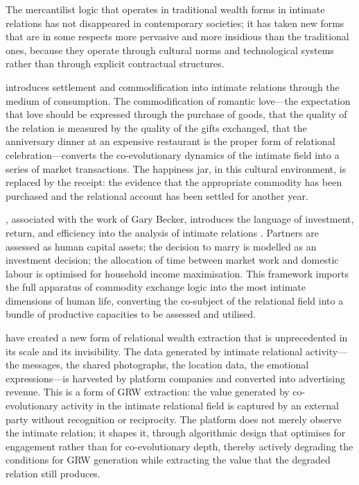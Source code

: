 \noindent
The mercantilist logic that operates in traditional wealth forms in intimate relations has not disappeared in contemporary societies; it has taken new forms that are in some respects more pervasive and more insidious than the traditional ones, because they operate through cultural norms and technological systems rather than through explicit contractual structures.

 introduces settlement and commodification into intimate relations through the medium of consumption. The commodification of romantic love---the expectation that love should be expressed through the purchase of goods, that the quality of the relation is measured by the quality of the gifts exchanged, that the anniversary dinner at an expensive restaurant is the proper form of relational celebration---converts the co-evolutionary dynamics of the intimate field into a series of market transactions. The happiness jar, in this cultural environment, is replaced by the receipt: the evidence that the appropriate commodity has been purchased and the relational account has been settled for another year.

, associated with the work of Gary Becker, introduces the language of investment, return, and efficiency into the analysis of intimate relations \parencite{maslow1954}. Partners are assessed as human capital assets; the decision to marry is modelled as an investment decision; the allocation of time between market work and domestic labour is optimised for household income maximisation. This framework imports the full apparatus of commodity exchange logic into the most intimate dimensions of human life, converting the co-subject of the relational field into a bundle of productive capacities to be assessed and utilised.

 have created a new form of relational wealth extraction that is unprecedented in its scale and its invisibility. The data generated by intimate relational activity---the messages, the shared photographs, the location data, the emotional expressions---is harvested by platform companies and converted into advertising revenue. This is a form of GRW extraction: the value generated by co-evolutionary activity in the intimate relational field is captured by an external party without recognition or reciprocity. The platform does not merely observe the intimate relation; it shapes it, through algorithmic design that optimises for engagement rather than for co-evolutionary depth, thereby actively degrading the conditions for GRW generation while extracting the value that the degraded relation still produces.

